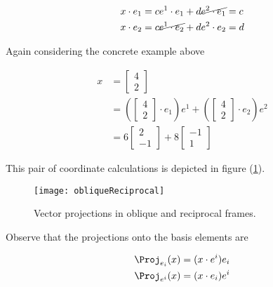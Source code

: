 \begin{equation}\label{eqn:gramSchmidtLorentz:360}
\begin{aligned}
x \cdot e_1 &= c e^1 \cdot e_1 + d \cancel{e^2 \cdot e_1} = c \\
x \cdot e_2 &= c \cancel{e^1 \cdot e_2} + d e^2 \cdot e_2 = d
\end{aligned}
\end{equation}

Again considering the concrete example above

\begin{equation}\label{eqn:gramSchmidtLorentz:290}
\begin{aligned}
x
&=
\begin{bmatrix}
4 \\
2
\end{bmatrix} \\
&=
\left(
\begin{bmatrix}
4 \\
2
\end{bmatrix}
\cdot e_1
\right)
e^1
+
\left(
\begin{bmatrix}
4 \\
2
\end{bmatrix}
\cdot e_2
\right)
e^2 \\
&= 6
\begin{bmatrix}
2 \\
-1
\end{bmatrix}
+
8
\begin{bmatrix}
-1 \\
1
\end{bmatrix}
\end{aligned}
\end{equation}

This pair of coordinate calculations is depicted in figure (\ref{fig:obliqueReciprocal}).

\begin{figure}[htp]
\centering
\texttt{[image: obliqueReciprocal]}
\caption{Vector projections in oblique and reciprocal frames.}\label{fig:obliqueReciprocal}
\end{figure}

Observe that the projections onto the basis elements are

\begin{align}\label{eqn:gramSchmidtLorentz:940}
\Proj_{e_i}(x) &= (x \cdot e^i) e_i \\
\Proj_{e^i}(x) &= (x \cdot e_i) e^i
\end{align}


